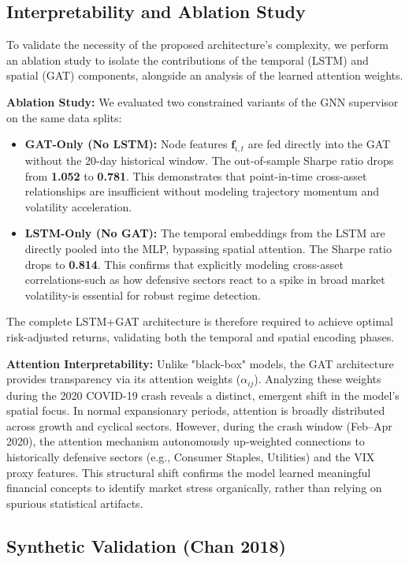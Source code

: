 \documentclass[conferences]{IEEEtran}
\begin{document}
\subsection{Interpretability and Ablation Study}
To validate the necessity of the proposed architecture's complexity, we perform an ablation study to isolate the contributions of the temporal (LSTM) and spatial (GAT) components, alongside an analysis of the learned attention weights.

\textbf{Ablation Study:} We evaluated two constrained variants of the GNN supervisor on the same data splits:
\begin{itemize}
    \item \textbf{GAT-Only (No LSTM):} Node features $\mathbf{f}_{i,t}$ are fed directly into the GAT without the 20-day historical window. The out-of-sample Sharpe ratio drops from \textbf{1.052} to \textbf{0.781}. This demonstrates that point-in-time cross-asset relationships are insufficient without modeling trajectory momentum and volatility acceleration.
    \item \textbf{LSTM-Only (No GAT):} The temporal embeddings from the LSTM are directly pooled into the MLP, bypassing spatial attention. The Sharpe ratio drops to \textbf{0.814}. This confirms that explicitly modeling cross-asset correlations-such as how defensive sectors react to a spike in broad market volatility-is essential for robust regime detection.
\end{itemize}
The complete LSTM+GAT architecture is therefore required to achieve optimal risk-adjusted returns, validating both the temporal and spatial encoding phases.

\textbf{Attention Interpretability:} Unlike "black-box" models, the GAT architecture provides transparency via its attention weights ($\alpha_{ij}$). Analyzing these weights during the 2020 COVID-19 crash reveals a distinct, emergent shift in the model's spatial focus. In normal expansionary periods, attention is broadly distributed across growth and cyclical sectors. However, during the crash window (Feb--Apr 2020), the attention mechanism autonomously up-weighted connections to historically defensive sectors (e.g., Consumer Staples, Utilities) and the VIX proxy features. This structural shift confirms the model learned meaningful financial concepts to identify market stress organically, rather than relying on spurious statistical artifacts.

\subsection{Synthetic Validation (Chan 2018)}
\end{document}
